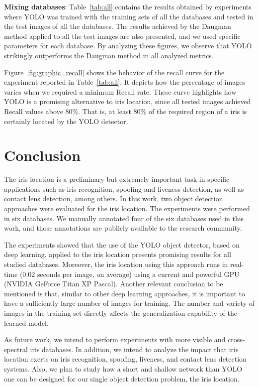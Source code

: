 \documentclass[conference]{IEEEtran}
\begin{document}
\textbf{Mixing databases}:
Table~\ref{tab:all} contains the results obtained by experiments where YOLO was trained with the training sets of all the databases and tested in the test images of all the databases.
The results achieved by the Daugman method applied to all the test images are also presented, and we used specific parameters for each database.
By analyzing these figures, we observe that YOLO strikingly outperforms the Daugman method in all analyzed metrics.

Figure~\ref{fig:graphic_recall} shows the behavior of the recall curve for the experiment reported in Table~\ref{tab:all}. 
It depicts how the percentage of images varies when we required a minimum Recall rate.
These curve highlights how YOLO is a promising alternative to iris location, since all tested images achieved Recall values above $80\%$.
That is, at least $80\%$ of the required region of a iris is certainly located by the YOLO detector.


\section{Conclusion}
\label{sec:conclusion}

The iris location is a preliminary but extremely important task in specific applications such as iris recognition, spoofing and liveness detection, as well as contact lens detection, among others.
In this work, two object detection approaches were evaluated for the iris location.
The experiments were performed in six databases. 
We manually annotated four of the six databases used in this work, and those annotations are publicly available to the research community.

The experiments showed that the use of the YOLO object detector, based on deep learning, applied to the iris location presents promising results for all studied databases. 
Moreover, the iris location using this approach runs in real-time ($0.02$ seconds per image, on average) using a current and powerful GPU (NVIDIA GeForce Titan XP Pascal).
Another relevant conclusion to be mentioned is that, similar to other deep learning approaches, it is important to have a sufficiently large number of images for training.
The number and variety of images in the training set directly affects the generalization capability of the learned model.

As future work, we intend to perform experiments with more visible and cross-spectral iris databases. 
In addition, we intend to analyze the impact that iris location exerts on iris recognition, spoofing, liveness, and contact lens detection systems.
Also, we plan to study how a short and shallow network than YOLO one can be designed for our single object detection problem, the iris location.
\end{document}
